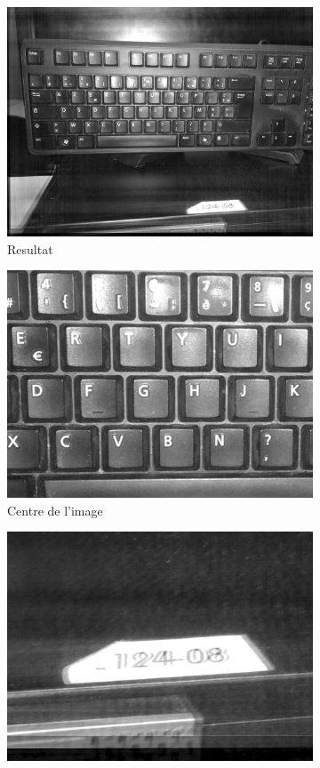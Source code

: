 \documentclass[a4paper,10pt]{report}
\begin{document}
\begin{figure}[h]

\begin{subfigure}{0.32\textwidth}
\includegraphics[width=0.9\linewidth]{ressource/flou_rot_10kit.jpg} 
\caption{Resultat}
\label{fig:Bestflou}
\end{subfigure}
\begin{subfigure}{0.32\textwidth}
\includegraphics[width=0.9\linewidth]{ressource/flou_rot_centre.png} 
\caption{Centre de l'image}
\label{fig:flouRotCenter}
\end{subfigure}
\begin{subfigure}{0.32\textwidth}
\includegraphics[width=0.9\linewidth]{ressource/flou_rot_bottom.png} 

\end{subfigure}
\end{figure}
\end{document}
